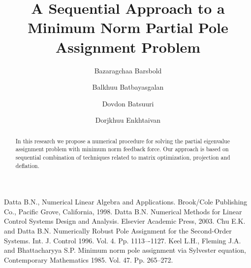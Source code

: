 \documentclass[12pt]{llncs}
\begin{document}
%
\fi

\title{A Sequential Approach to a Minimum Norm Partial Pole Assignment Problem}
\author{Bazaragchaa Barsbold
  \and
  Balkhuu Batbayasgalan
  \and
  Dovdon Batsuuri
  \and
  Dorjkhuu Enkhtaivan
}

\maketitle

\begin{abstract}
In this research we propose a numerical procedure for solving the partial eigenvalue
assignment problem with minimum norm feedback force. Our approach is based on 
sequential combination of techniques related to matrix optimization, projection and 
deflation.
\end{abstract}





\begin{thebibliography}{9}  
 Datta B.N., Numerical Linear Algebra and Applications. Brook/Cole Publishing Co., Pacific Grove, California, 1998.
 Datta B.N. Numerical Methods for Linear Control Systems Design and Analysis. Elsevier 
Academic Press, 2003.
 Chu E.K. and Datta B.N. Numerically Robust Pole Assignment for the Second-Order 
Systems. Int. J. Control 1996. Vol. 4. Pp. 1113–-1127.
  Keel L.H., Fleming J.A. and Bhattacharyya S.P. Minimum norm pole assignment via 
Sylvester equation, Contemporary Mathematics  1985. Vol. 47. Pp. 265--272.
\end{thebibliography}

\end{document}
